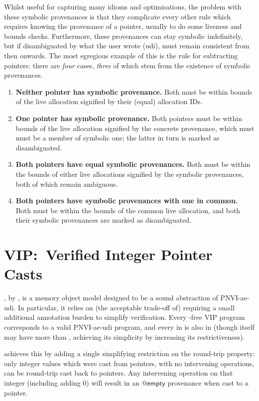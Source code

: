 Whilst useful for capturing many idioms and optimisations, the problem with these
symbolic provenances is that they complicate every other rule which requires
knowing the provenance of a pointer, usually to do some liveness and bounds checks.
Furthermore, these provenances can stay symbolic indefinitely, but if disambiguated
by what the user wrote (udi), must remain consistent from then onwards. The
most egregious example of this is the rule for subtracting pointers: there
are \emph{four} cases, \emph{three} of which stem from the existence of symbolic
provenances.
\begin{enumerate}
    \item \textbf{Neither pointer has symbolic provenance.} Both must be within
        bounds of the live allocation signified by their (equal) allocation
        IDs.
    \item \textbf{One pointer has symbolic provenance.} Both pointers must be
        within bounds of the live allocation signified by the concrete
        provenance, which must must be a member of symbolic one; the latter in
        turn is marked as disambiguated.
    \item \textbf{Both pointers have equal symbolic provenances.} Both must
        be within the bounds of either live allocations signified by the
        symbolic provenances, both of which remain ambiguous.
    \item \textbf{Both pointers have symbolic provenances with one in common.}
        Both must be within the bounds of the common live allocation, and
        both their symbolic provenances are marked as disambiguated.
\end{enumerate}

\section{VIP:\ Verified Integer Pointer Casts}

, by , is a memory object model designed
to be a sound abstraction of PNVI-ae-udi. In particular, it relies on (the
acceptable trade-off of) requiring a small additional annotation burden to
simplify verification. Every -free VIP program corresponds to a valid
PNVI-ae-udi program, and every  in  is also  in
 (though  itself may have more  than ,
achieving its simplicity by increasing its restrictiveness).

 achieves this by adding a single simplifying restriction on the
round-trip property: only integer values which were cast from pointers, with no
intervening operations, can be round-trip cast back to pointers. Any
intervening operation on that integer (including adding 0) will result in an
$\mathsf{@empty}$ provenance when cast to a pointer.

